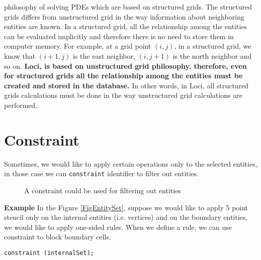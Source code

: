 philosophy of solving PDEs which are based on structured grids. The structured
grids differs from unstructured grid in the way information about neighboring
entities are known. In a structured grid, all the relationship among the
entities can be evaluated implicitly and therefore there is no need to store
them in computer memory. For example, at a grid point $(i,j)$, in a structured
grid, we know that $(i+1,j)$ is the east neighbor, $(i,j+1)$ is the north
neighbor and so on. {\bf Loci, is based on unstructured grid philosophy,
therefore, even for structured grids all the relationship among the entities
must be created and stored in the database.} In other words, in Loci, all 
structured grids calculations must be done in the way unstructured grid
calculations are performed.
%


%


\section {Constraint}
Sometimes, we would like to apply certain operations only to the selected entities, 
in those case we can {\tt constraint} identifier to filter out entities.

\begin{figure}[h]
\vspace*{8cm}\caption {A constraint could be used for filtering out entities }
\label{FigConstraint}
\end{figure}

\par {\bf Example} In the Figure \ref{FigEntitySet}, suppose we would like to 
apply 5 point stencil only on the internal entities (i.e. vertices) and on the 
boundary entities, we would like to apply one-sided rules. When we define a 
rule, we can use constraint to block boundary cells. \\
\begin{verbatim}
constraint (internalSet);
\end{verbatim}


